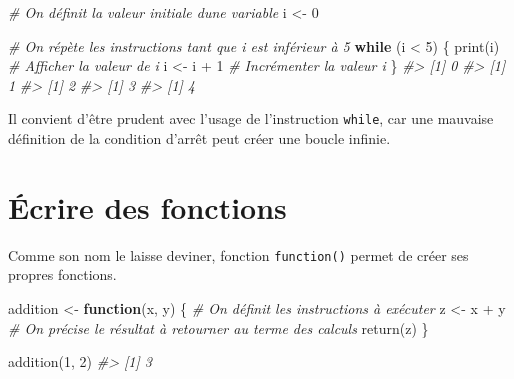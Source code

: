 \documentclass[
  french,
]{scrbook}
\newenvironment{Shaded}{\begin{snugshade}}{\end{snugshade}}
\newcommand{\CommentTok}[1]{\textcolor[rgb]{0.56,0.35,0.01}{\textit{#1}}}
\newcommand{\ControlFlowTok}[1]{\textcolor[rgb]{0.13,0.29,0.53}{\textbf{#1}}}
\newcommand{\DecValTok}[1]{\textcolor[rgb]{0.00,0.00,0.81}{#1}}
\newcommand{\FunctionTok}[1]{\textcolor[rgb]{0.00,0.00,0.00}{#1}}
\newcommand{\NormalTok}[1]{#1}
\newcommand{\OtherTok}[1]{\textcolor[rgb]{0.56,0.35,0.01}{#1}}
\newcommand{\SpecialCharTok}[1]{\textcolor[rgb]{0.00,0.00,0.00}{#1}}
\begin{document}
\begin{Shaded}
\begin{Highlighting}[]
\CommentTok{\# On définit la valeur initiale d\textquotesingle{}une variable}
\NormalTok{i }\OtherTok{\textless{}{-}} \DecValTok{0}

\CommentTok{\# On répète les instructions tant que i est inférieur à 5}
\ControlFlowTok{while}\NormalTok{ (i }\SpecialCharTok{\textless{}} \DecValTok{5}\NormalTok{) \{}
  \FunctionTok{print}\NormalTok{(i)   }\CommentTok{\# Afficher la valeur de i}
\NormalTok{  i }\OtherTok{\textless{}{-}}\NormalTok{ i }\SpecialCharTok{+} \DecValTok{1} \CommentTok{\# Incrémenter la valeur i}
\NormalTok{\}}
\CommentTok{\#\textgreater{} [1] 0}
\CommentTok{\#\textgreater{} [1] 1}
\CommentTok{\#\textgreater{} [1] 2}
\CommentTok{\#\textgreater{} [1] 3}
\CommentTok{\#\textgreater{} [1] 4}
\end{Highlighting}
\end{Shaded}

\begin{tcolorbox}[fonttitle=\sffamily\bfseries\large,title=Remarque,colframe=darkblue]

Il convient d'être prudent avec l'usage de l'instruction \texttt{while}, car une mauvaise définition de la condition d'arrêt peut créer une boucle infinie.

\end{tcolorbox}

\hypertarget{fonctions-ecrire}{%
\chapter{Écrire des fonctions}\label{fonctions-ecrire}}

Comme son nom le laisse deviner, fonction \texttt{function()} permet de créer ses propres fonctions.

\begin{Shaded}
\begin{Highlighting}[]
\NormalTok{addition }\OtherTok{\textless{}{-}} \ControlFlowTok{function}\NormalTok{(x, y) \{}
  \CommentTok{\# On définit les instructions à exécuter}
\NormalTok{  z }\OtherTok{\textless{}{-}}\NormalTok{ x }\SpecialCharTok{+}\NormalTok{ y}
  \CommentTok{\# On précise le résultat à retourner au terme des calculs}
  \FunctionTok{return}\NormalTok{(z)}
\NormalTok{\}}

\FunctionTok{addition}\NormalTok{(}\DecValTok{1}\NormalTok{, }\DecValTok{2}\NormalTok{)}
\CommentTok{\#\textgreater{} [1] 3}
\end{Highlighting}
\end{Shaded}
\end{document}
